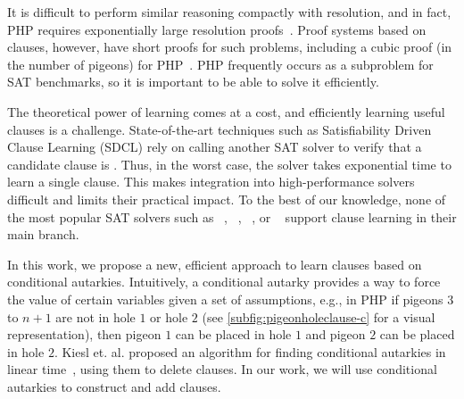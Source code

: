 It is difficult to perform similar reasoning compactly with resolution, and in
fact, PHP requires exponentially large resolution
proofs~\cite{hakenpigeonhole}. Proof systems
based on \pr clauses, however, have short proofs for such problems, including a
cubic proof (in the number of pigeons) for PHP~\cite{prclauses}. PHP frequently occurs
as a subproblem for SAT benchmarks, so it is important to be able to solve it efficiently.

The theoretical power of \pr learning comes at a cost, and efficiently learning
useful \pr clauses is a challenge. State-of-the-art techniques such as
Satisfiability Driven Clause Learning (SDCL) rely on calling another SAT solver
to verify that a candidate clause is \pr \cite{sadical}. 
Thus, in the worst case, the solver takes exponential time to learn a single \pr
clause. This makes integration into high-performance solvers difficult and
limits their practical impact. To the best of our knowledge, none of the most popular SAT solvers
such as \cadical~\cite{cadical}, \kissat~\cite{kissat},
\cryptoMiniSAT~\cite{cryptominisat}, or \lingeling~\cite{lingeling} support
\pr clause learning in their main branch.

In this work, we propose a new, efficient approach to learn \pr clauses
based on conditional autarkies. Intuitively, a conditional autarky provides a
way to force the value of certain variables given a set of assumptions, e.g., in
PHP if pigeons $3 $ to $ n+1$ are not in hole $1$ or hole $2$ (see \autoref{subfig:pigeonholeclause-c}
for a visual representation), then pigeon $1$
can be placed in hole $1$ and pigeon $2$ can be placed in hole $2$. Kiesl et.
al. proposed an algorithm for finding conditional autarkies in linear
time~\cite{conditionalautarkies}, using them to delete clauses. In our work, we
will use conditional autarkies to construct and add \pr clauses. 
%

